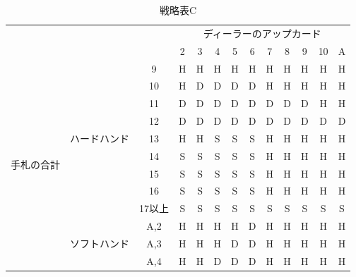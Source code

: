 \begin{table}[H]
    \begin{center}
    \caption{戦略表C}
    \begin{tabular}{|c|c|c|c|c|c|c|c|c|c|c|c|c|}
    \hline
    \multicolumn{3}{|c|}{\multirow{2}{*}{}}                     & \multicolumn{10}{c|}{ディーラーのアップカード}     \\ \cline{4-13} 
    \multicolumn{3}{|c|}{}                                      & 2 & 3 & 4 & 5 & 6 & 7 & 8 & 9 & 10 & A \\ \hline
    \multirow{28}{*}{手札の合計} & \multirow{9}{*}{ハードハンド}   & 9     & H & H & H & H & H & H & H & H & H  & H \\ \cline{3-13} 
                            &                           & 10    & H & D & D & D & D & H & H & H & H  & H \\ \cline{3-13} 
                            &                           & 11    & D & D & D & D & D & D & D & D & H  & H \\ \cline{3-13} 
                            &                           & 12    & D & D & D & D & D & D & D & D & D  & D \\ \cline{3-13} 
                            &                           & 13    & H & H & S & S & S & H & H & H & H  & H \\ \cline{3-13} 
                            &                           & 14    & S & S & S & S & S & H & H & H & H  & H \\ \cline{3-13} 
                            &                           & 15    & S & S & S & S & S & H & H & H & H  & H \\ \cline{3-13} 
                            &                           & 16    & S & S & S & S & S & H & H & H & H  & H \\ \cline{3-13} 
                            &                           & 17以上  & S & S & S & S & S & S & S & S & S  & S \\ \cline{2-13} 
                            & \multirow{9}{*}{ソフトハンド}   & A,2   & H & H & H & H & D & H & H & H & H  & H \\ \cline{3-13} 
                            &                           & A,3   & H & H & H & D & D & H & H & H & H  & H \\ \cline{3-13} 
                            &                           & A,4   & H & H & D & D & D & H & H & H & H  & H \\ \cline{3-13} 

\end{tabular}
\end{center}
\end{table}
